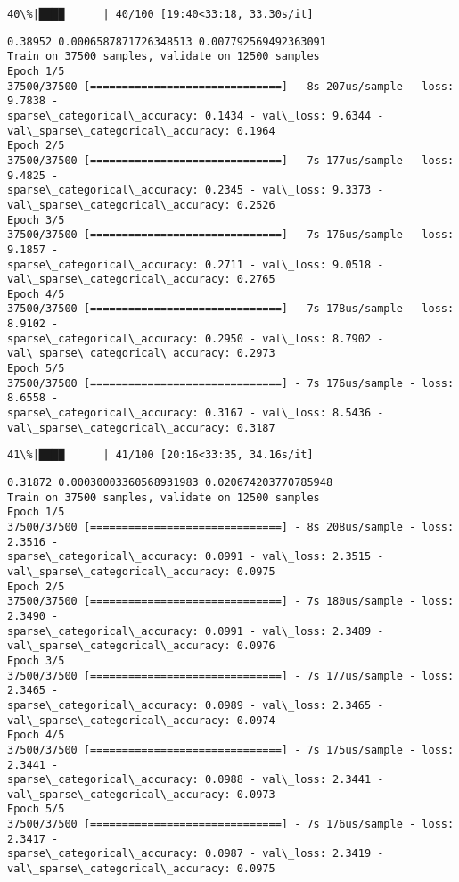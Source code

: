 \documentclass[11pt]{article}
\begin{document}
    \begin{Verbatim}[commandchars=\\\{\}]
 40\%|████      | 40/100 [19:40<33:18, 33.30s/it]
    \end{Verbatim}

    \begin{Verbatim}[commandchars=\\\{\}]
0.38952 0.0006587871726348513 0.007792569492363091
Train on 37500 samples, validate on 12500 samples
Epoch 1/5
37500/37500 [==============================] - 8s 207us/sample - loss: 9.7838 -
sparse\_categorical\_accuracy: 0.1434 - val\_loss: 9.6344 -
val\_sparse\_categorical\_accuracy: 0.1964
Epoch 2/5
37500/37500 [==============================] - 7s 177us/sample - loss: 9.4825 -
sparse\_categorical\_accuracy: 0.2345 - val\_loss: 9.3373 -
val\_sparse\_categorical\_accuracy: 0.2526
Epoch 3/5
37500/37500 [==============================] - 7s 176us/sample - loss: 9.1857 -
sparse\_categorical\_accuracy: 0.2711 - val\_loss: 9.0518 -
val\_sparse\_categorical\_accuracy: 0.2765
Epoch 4/5
37500/37500 [==============================] - 7s 178us/sample - loss: 8.9102 -
sparse\_categorical\_accuracy: 0.2950 - val\_loss: 8.7902 -
val\_sparse\_categorical\_accuracy: 0.2973
Epoch 5/5
37500/37500 [==============================] - 7s 176us/sample - loss: 8.6558 -
sparse\_categorical\_accuracy: 0.3167 - val\_loss: 8.5436 -
val\_sparse\_categorical\_accuracy: 0.3187
    \end{Verbatim}

    \begin{Verbatim}[commandchars=\\\{\}]
 41\%|████      | 41/100 [20:16<33:35, 34.16s/it]
    \end{Verbatim}

    \begin{Verbatim}[commandchars=\\\{\}]
0.31872 0.00030003360568931983 0.020674203770785948
Train on 37500 samples, validate on 12500 samples
Epoch 1/5
37500/37500 [==============================] - 8s 208us/sample - loss: 2.3516 -
sparse\_categorical\_accuracy: 0.0991 - val\_loss: 2.3515 -
val\_sparse\_categorical\_accuracy: 0.0975
Epoch 2/5
37500/37500 [==============================] - 7s 180us/sample - loss: 2.3490 -
sparse\_categorical\_accuracy: 0.0991 - val\_loss: 2.3489 -
val\_sparse\_categorical\_accuracy: 0.0976
Epoch 3/5
37500/37500 [==============================] - 7s 177us/sample - loss: 2.3465 -
sparse\_categorical\_accuracy: 0.0989 - val\_loss: 2.3465 -
val\_sparse\_categorical\_accuracy: 0.0974
Epoch 4/5
37500/37500 [==============================] - 7s 175us/sample - loss: 2.3441 -
sparse\_categorical\_accuracy: 0.0988 - val\_loss: 2.3441 -
val\_sparse\_categorical\_accuracy: 0.0973
Epoch 5/5
37500/37500 [==============================] - 7s 176us/sample - loss: 2.3417 -
sparse\_categorical\_accuracy: 0.0987 - val\_loss: 2.3419 -
val\_sparse\_categorical\_accuracy: 0.0975
    \end{Verbatim}
\end{document}
